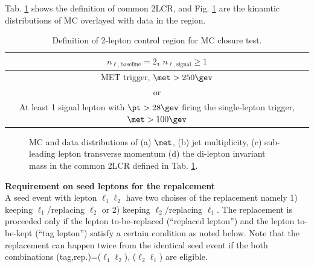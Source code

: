 Tab. \ref{tab::BGestimation::objRep::def2LCR} shows the definition of common 2LCR, and Fig. \ref{fig::BGestimation::objRep::2LCR} are the kinamtic distributions of MC overlayed with data in the region. 

\begin{table}[h]
  \begin{center}
    \caption{Definition of 2-lepton control region for MC closure test.}
    \begin{tabular}{ c }
      \hline
       $n_{\ell, \mathrm{baseline}}=2$, $n_{\ell, \mathrm{signal}}\ge 1$ \\
      \hline
       MET trigger,  $\met>250\gev$   \\
       or \\
       At least 1 signal lepton with $\pt>28 \gev$ firing the single-lepton trigger, $\met>100\gev$   \\
      \hline
    \end{tabular}  \label{tab::BGestimation::objRep::def2LCR}
  \end{center}
\end{table}

\clearpage
\begin{figure}[h]
  \centering
 
   \caption{ MC and data distributions of (a) $\met$, (b) jet multiplicity, (c) sub-leading lepton transverse momentum (d) the di-lepton invariant mass in the common 2LCR defined in Tab. \ref{tab::BGestimation::objRep::def2LCR}.  \label{fig::BGestimation::objRep::2LCR}}    
\end{figure}
\clearpage



\noindent \textbf{Requirement on seed leptons for the repalcement} \\
A seed event with lepton $\ell_1 \ell_2$ have two choises of the replacement namely 1) keeping $\ell_1$/replacing $\ell_2$ or 2) keeping $\ell_2$/replacing $\ell_1$. The replacement is proceeded only if the lepton to-be-replaced (``replaced lepton'') and the lepton to-be-kept (``tag lepton'') satisfy a certain condition as noted below. Note that the replacement can happen twice from the identical seed event if the both combinations (tag,rep.)=($\ell_1 \ell_2$), ($\ell_2 \ell_1$) are eligible. \\

